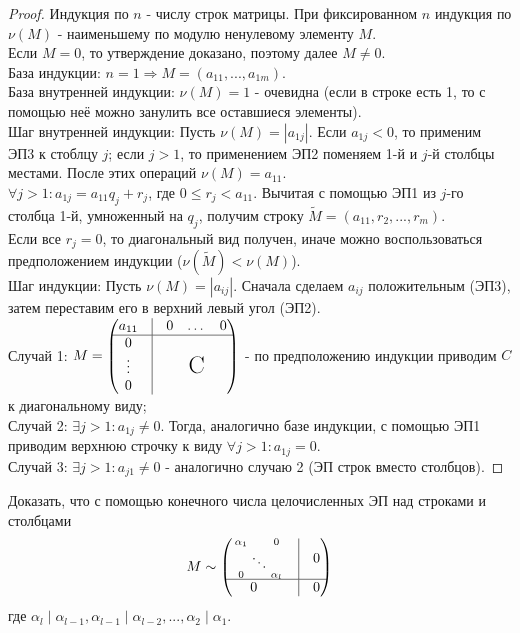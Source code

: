 \begin{proof}
    Индукция по $n$ - числу строк матрицы.
    При фиксированном $n$ индукция по $\nu(M)$ - наименьшему по модулю ненулевому элементу $M$. \\
    Если $M=0$, то утверждение доказано, поэтому далее $M \neq 0$.\\
    База индукции: $n=1 \Longrightarrow M = (a_{11},...,a_{1m})$.\\
    \tab База внутренней индукции: $\nu(M) = 1$ - очевидна (если в строке есть 1, то с помощью неё можно занулить все оставшиеся элементы).\\
    \tab Шаг внутренней индукции: Пусть $\nu(M) = |a_{1j}|$. Если $a_{1j} < 0$, то применим ЭП3 к стоблцу $j$; если $j > 1$, то применением ЭП2 поменяем 1-й и $j$-й столбцы местами. После этих операций $\nu(M) = a_{11}$.\\
    $\forall j > 1: a_{1j} = a_{11}q_j + r_j$, где $0 \leqslant r_j < a_{11}$. Вычитая с помощью ЭП1 из $j$-го столбца 1-й, умноженный на $q_j$, получим строку $\tilde{M} = (a_{11}, r_2,...,r_m)$.\\
    Если все $r_j = 0$, то диагональный вид получен, иначе можно воспользоваться предположением индукции ($\nu(\tilde{M}) < \nu(M)$).\\
    Шаг индукции: Пусть $\nu(M) = |a_{ij}|$. Сначала сделаем $a_{ij}$ положительным (ЭП3), затем переставим его в верхний левый угол (ЭП2).\\
    \tab Случай 1: $M = \begin{pmatrix} a_{11}&\vline&0&\dots&0\\ \hline 0&\vline \\ \vdots&\vline&&\text{\LARGE{C}}  \\ 0 & \vline \end{pmatrix}$ - по предположению индукции приводим $C$ к диагональному виду;\\
    \tab Случай 2: $\exists j > 1: a_{1j} \neq 0$. Тогда, аналогично базе индукции, с помощью ЭП1 приводим верхнюю строчку к виду $\forall j > 1: a_{1j} = 0$.\\
    \tab Случай 3: $\exists j > 1: a_{j1} \neq 0$ - аналогично случаю 2 (ЭП строк вместо столбцов). 
\end{proof}
\begin{exercise}
    Доказать, что с помощью конечного числа целочисленных ЭП над строками и столбцами \[M \sim \begin{pmatrix}
      \begin{smallmatrix}
    \alpha_1&&0\\ &\ddots&\\ 0&&\alpha_l
    \end{smallmatrix}  & \vline  & 0\\
     \hline
       0  \ \ & \vline& 0\\

    \end{pmatrix}\] 
    где $\alpha_l \mid \alpha_{l-1}, \alpha_{l-1} \mid \alpha_{l-2}, ..., \alpha_2 \mid \alpha_1$.
\end{exercise}
